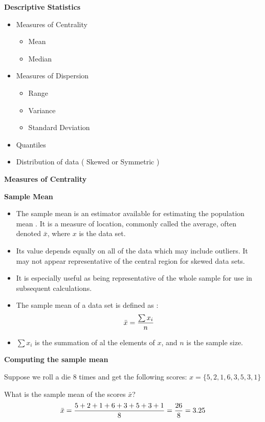 \documentclass[]{report}
\begin{document}
{

\textbf{Descriptive Statistics}

\begin{itemize}
\item Measures of Centrality
\begin{itemize}
\item Mean
\item Median
\end{itemize}
\item Measures of Dispersion
\begin{itemize}
\item Range
\item Variance
\item Standard Deviation
\end{itemize}
\item Quantiles
\item Distribution of data ( Skewed or Symmetric )
\end{itemize}

}
{
\textbf{Measures of Centrality}



}
{
\textbf{Sample Mean}

\begin{itemize} 
\item The sample mean is an estimator available for estimating the population mean . It is a measure of location, commonly called the average, often denoted $\bar{x}$, where $x$ is the data set.
\item 
Its value depends equally on all of the data which may include outliers. It may not appear representative of the central region for skewed data sets.
\item
It is especially useful as being representative of the whole sample for use in subsequent calculations.
\item The sample mean of a data set is defined as :
\[ \bar{x} = { \sum x_i\over n}\]
\item $\sum x_i$ is the summation of al the elements of $x$, and $n$ is the sample size.
\end{itemize}
}
{
\textbf{Computing the sample mean}

Suppose we roll a die 8 times and get the following scores: $x = \{ 5, 2, 1, 6, 3, 5, 3, 1\}$ \\ \bigskip

What is the sample mean of the scores $\bar{x}$?
\[ \bar{x}  = {5 + 2 +  1 +  6 +  3 +  5 +  3 +  1 \over 8 } = {26 \over 8} =  3.25 \]



}
\end{document}
